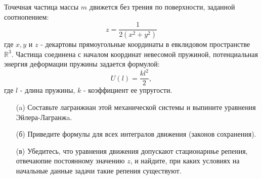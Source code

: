 \begin{prob}
Точечная частица массы $m$ движется без трения по поверхности, заданной соотнопением:
$$
z=\frac{1}{2\left(x^2+y^2\right)}
$$
где $x, y$ и $z$ - декартовы прямоугольные координаты в евклидовом пространстве $\mathbb{R}^3$. Частища соединена с началом координат невесомой пружиной, потенциальная энергия деформации пружины задается формулой:
$$
U(l)=\frac{k l^2}{2},
$$
где $l$ - длина пружины, $k$ - коэффициент ее упругости.
\begin{itemize}
\item[]
\item[(a)] Составьте лагранжиан этой механической системы и выпините уравнения Эйлера-Лагранжa.
\item[(б)] Приведите формулы для всех интегралов движения (законов сохранения).
\item[(в)] Убедитесь, что уравнения движения допускают стационарнње репения, отвечаюпие постоянному значению $z$, и найдите, при каких условиях на начальные данные задачи такие репения существуют.
\end{itemize}
\end{prob}

